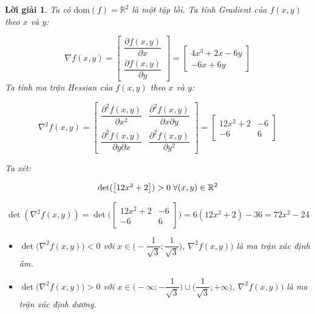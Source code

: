 \documentclass[14pt, a4paper]{article}
\theoremstyle{sltheorem}
\theoremstyle{soltheorem}
\newtheorem*{loigiai}{Lời giải}
\begin{document}
    \begin{loigiai}
        Ta có $\mathrm{dom}(f)=\mathbb{R}^2$ là một tập lồi. Ta tính Gradient của $f(x, y)$ theo $x$ và $y$:

        \begin{equation*}
            \nabla f(x, y) = \begin{bmatrix} \dfrac{\partial f(x, y)}{\partial x} \\ \dfrac{\partial f(x, y)}{\partial y}\end{bmatrix} = \begin{bmatrix} 4x^3 + 2x - 6y \\ -6x + 6y \end{bmatrix}
        \end{equation*}
        Ta tính ma trận Hessian của $f(x, y)$ theo $x$ và $y$:

        \begin{equation*}
            \nabla^2 f(x,y)=\begin{bmatrix} \dfrac{\partial^2 f(x, y)}{\partial x^2} & \dfrac{\partial^2 f(x, y)}{\partial x\partial y} \\ \dfrac{\partial^2 f(x, y)}{\partial y \partial x } & \dfrac{\partial^2 f(x, y)}{\partial y^2 } \end{bmatrix}=\begin{bmatrix} 12x^2 + 2 & -6 \\ -6 & 6 \end{bmatrix}
        \end{equation*}

        Ta xét:

        \begin{equation*}
            \det(\begin{bmatrix} 12x^2 + 2  \end{bmatrix})>0 \thickspace \forall (x, y) \in \mathbb{R}^2
        \end{equation*}

        \begin{equation*}
            \det(\nabla^2 f(x,y))=\det\Bigg(\begin{bmatrix} 12x^2 + 2 & -6 \\ -6 & 6 \end{bmatrix} \Bigg)=6(12x^2 + 2) - 36 =72x^2 - 24
        \end{equation*}

        \begin{itemize}
            \item $\det\Big(\nabla^2 f(x,y)\Big) < 0$ với $x \in \Big(-\dfrac{1}{\sqrt{3}}; \dfrac{1}{\sqrt{3}}\Big)$, $\nabla^2 f(x,y))$ là ma trận xác định âm.
            \item $\det\Big(\nabla^2 f(x,y)\Big) > 0$ với $x \in \Big(-\infty;-\dfrac{1}{\sqrt{3}}\Big) \cup \Big(\dfrac{1}{\sqrt{3}}; +\infty\Big)$, $\nabla^2 f(x,y))$ là ma trận xác định dương.
        \end{itemize}


\end{loigiai}
\end{document}
